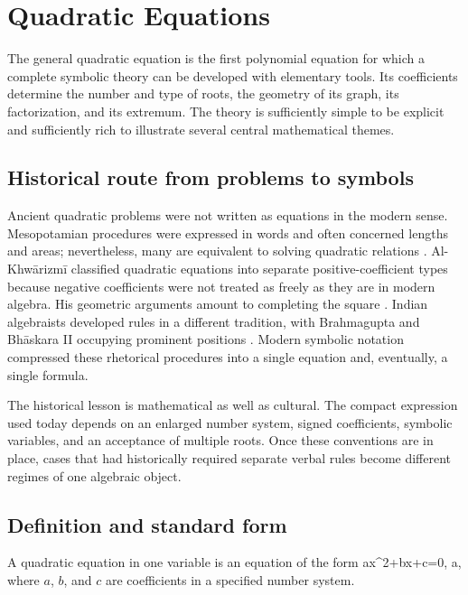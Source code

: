 \section{Quadratic Equations}

The general quadratic equation is the first polynomial equation for which a complete symbolic theory can be developed with elementary tools. Its coefficients determine the number and type of roots, the geometry of its graph, its factorization, and its extremum. The theory is sufficiently simple to be explicit and sufficiently rich to illustrate several central mathematical themes.

\subsection{Historical route from problems to symbols}

Ancient quadratic problems were not written as equations in the modern sense. Mesopotamian procedures were expressed in words and often concerned lengths and areas; nevertheless, many are equivalent to solving quadratic relations \cite{robson2008}. Al-Khw\={a}rizm\={i} classified quadratic equations into separate positive-coefficient types because negative coefficients were not treated as freely as they are in modern algebra. His geometric arguments amount to completing the square \cite{rosen1831,swetzkatz2011}. Indian algebraists developed rules in a different tradition, with Brahmagupta and Bh\={a}skara II occupying prominent positions \cite{plofker2009,colebrooke1817}. Modern symbolic notation compressed these rhetorical procedures into a single equation and, eventually, a single formula.

The historical lesson is mathematical as well as cultural. The compact expression used today depends on an enlarged number system, signed coefficients, symbolic variables, and an acceptance of multiple roots. Once these conventions are in place, cases that had historically required separate verbal rules become different regimes of one algebraic object.

\subsection{Definition and standard form}

\begin{definition}
A quadratic equation in one variable is an equation of the form
\be
ax^2+bx+c=0,
\qquad a,
\ee
where $a$, $b$, and $c$ are coefficients in a specified number system.
\end{definition}

